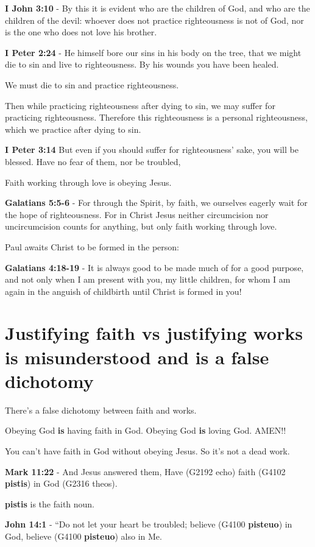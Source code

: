 \documentclass[11pt]{article}
\begin{document}
\textbf{I John 3:10} - By this it is evident who are the children of God, and who are the children of the devil: whoever does not practice righteousness is not of God, nor is the one who does not love his brother.

\textbf{I Peter 2:24} - He himself bore our sins in his body on the tree, that we might die to sin and live to righteousness. By his wounds you have been healed.

We must die to sin and practice righteousness.

Then while practicing righteousness after dying to sin, we may suffer for practicing righteousness.
Therefore this righteousness is a personal righteousness, which we practice after dying to sin.

\textbf{I Peter 3:14} But even if you should suffer for righteousness' sake, you will be blessed. Have no fear of them, nor be troubled,

Faith working through love is obeying Jesus.

\textbf{Galatians 5:5-6} - For through the Spirit, by faith, we ourselves eagerly wait for the hope of righteousness. For in Christ Jesus neither circumcision nor uncircumcision counts for anything, but only faith working through love.

Paul awaits Christ to be formed in the person:

\textbf{Galatians 4:18-19} - It is always good to be made much of for a good purpose, and not only when I am present with you, my little children, for whom I am again in the anguish of childbirth until Christ is formed in you!

\section{Justifying faith vs justifying works is misunderstood and is a false dichotomy}
\label{sec:org362d470}
There's a false dichotomy between faith and works.

Obeying God \textbf{is} having faith in God. Obeying God \textbf{is} loving God. AMEN!!

You can't have faith in God without obeying Jesus. So it's not a dead work.

\textbf{Mark 11:22} - And Jesus answered them, Have (G2192 echo) faith (G4102 \textbf{pistis}) in God (G2316 theos).

\textbf{pistis} is the faith noun.

\textbf{John 14:1} - “Do not let your heart be troubled; believe (G4100 \textbf{pisteuo}) in God, believe (G4100 \textbf{pisteuo}) also in Me.
\end{document}
